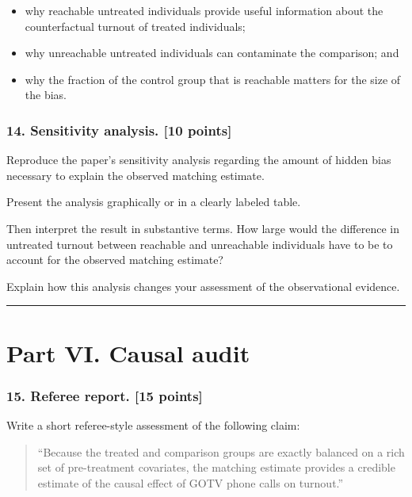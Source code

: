 \documentclass[
]{article}
\providecommand{\tightlist}{%
  \setlength{\itemsep}{0pt}\setlength{\parskip}{0pt}}
\begin{document}
\begin{itemize}
\tightlist
\item
  why reachable untreated individuals provide useful information about
  the counterfactual turnout of treated individuals;
\item
  why unreachable untreated individuals can contaminate the comparison;
  and
\item
  why the fraction of the control group that is reachable matters for
  the size of the bias.
\end{itemize}

\subsubsection{14. Sensitivity analysis. {[}10
points{]}}\label{sensitivity-analysis.-10-points}

Reproduce the paper's sensitivity analysis regarding the amount of
hidden bias necessary to explain the observed matching estimate.

Present the analysis graphically or in a clearly labeled table.

Then interpret the result in substantive terms. How large would the
difference in untreated turnout between reachable and unreachable
individuals have to be to account for the observed matching estimate?

Explain how this analysis changes your assessment of the observational
evidence.

\begin{center}\rule{0.5\linewidth}{0.5pt}\end{center}

\section{Part VI. Causal audit}\label{part-vi.-causal-audit}

\subsubsection{15. Referee report. {[}15
points{]}}\label{referee-report.-15-points}

Write a short referee-style assessment of the following claim:

\begin{quote}
``Because the treated and comparison groups are exactly balanced on a
rich set of pre-treatment covariates, the matching estimate provides a
credible estimate of the causal effect of GOTV phone calls on turnout.''
\end{quote}
\end{document}

